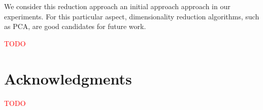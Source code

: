 \documentclass[sn-mathphys]{sn-jnl}%
\theoremstyle{thmstyleone}%
\theoremstyle{thmstyletwo}%
\theoremstyle{thmstylethree}%
\begin{document}
We consider this reduction approach an initial approach approach in our experiments.
For this particular aspect, dimensionality reduction algorithms, such as PCA, are good candidates for future work.


\textcolor{red}{TODO}


\section{Acknowledgments}

\textcolor{red}{TODO}





\end{document}
